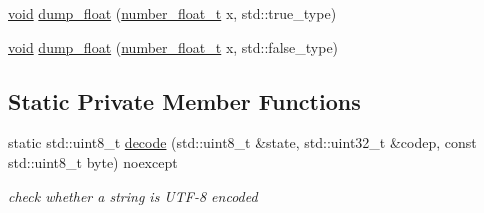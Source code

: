 \begin{DoxyCompactItemize}
\hyperlink{namespacenlohmann_1_1detail_a59fca69799f6b9e366710cb9043aa77d}{void} \hyperlink{classnlohmann_1_1detail_1_1serializer_a24b0fe45dc774441237bde198a133d8a}{dump\+\_\+float} (\hyperlink{classnlohmann_1_1detail_1_1serializer_a460c6794fbabbb2ae83380e987a6c030}{number\+\_\+float\+\_\+t} x, std\+::true\+\_\+type)
\item 
\hyperlink{namespacenlohmann_1_1detail_a59fca69799f6b9e366710cb9043aa77d}{void} \hyperlink{classnlohmann_1_1detail_1_1serializer_a331dad892fc00313f928fdaa6bc8f849}{dump\+\_\+float} (\hyperlink{classnlohmann_1_1detail_1_1serializer_a460c6794fbabbb2ae83380e987a6c030}{number\+\_\+float\+\_\+t} x, std\+::false\+\_\+type)
\end{DoxyCompactItemize}
\subsection*{Static Private Member Functions}
\begin{DoxyCompactItemize}
\item 
static std\+::uint8\+\_\+t \hyperlink{classnlohmann_1_1detail_1_1serializer_abdcc4fd1dc5d3afb6c0817e4c89b1242}{decode} (std\+::uint8\+\_\+t \&state, std\+::uint32\+\_\+t \&codep, const std\+::uint8\+\_\+t byte) noexcept
\begin{DoxyCompactList}\small\item\em check whether a string is U\+T\+F-\/8 encoded \end{DoxyCompactList}\end{DoxyCompactItemize}
